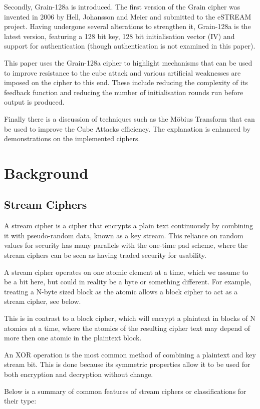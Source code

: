 \documentclass{report}
\let\Oldsection\section
\renewcommand{\section}{\FloatBarrier\Oldsection}
\begin{document}
Secondly, Grain-128a is introduced. The first version of the Grain cipher was invented in 2006 by Hell, Johansson and Meier \cite{Grain128aSpec} and submitted to the eSTREAM project. Having undergone several alterations to strengthen it, Grain-128a is the latest version, featuring a 128 bit key, 128 bit initialisation vector (IV) and support for authentication (though authentication is not examined in this paper).

This paper uses the Grain-128a cipher to highlight mechanisms that can be used to improve resistance to the cube attack and various artificial weaknesses are imposed on the cipher to this end. These include reducing the complexity of its feedback function and reducing the number of initialisation rounds run before output is produced.

Finally there is a discussion of techniques such as the Möbius Transform that can be used to improve the Cube Attacks efficiency. The explanation is enhanced by demonstrations on the implemented ciphers.

\chapter{Background}
\section{Stream Ciphers}
A stream cipher is a cipher that encrypts a plain text continuously by combining it with pseudo-random data, known as a key stream. This reliance on random values for security has many parallels with the one-time pad scheme, where the stream ciphers can be seen as having traded security for usability.

A stream cipher operates on one atomic element at a time, which we assume to be a bit here, but could in reality be a byte or something different. For example, treating a N-byte sized block as the atomic allows a block cipher to act as a stream cipher, see below.

This is in contrast to a block cipher, which will encrypt a plaintext in blocks of N atomics at a time, where the atomics of the resulting cipher text may depend of more then one atomic in the plaintext block.

An XOR operation is the most common method of combining a plaintext and key stream bit. This is done because its symmetric properties allow it to be used for both encryption and decryption without change.

Below is a summary of common features of stream ciphers or classifications for their type:
\end{document}
